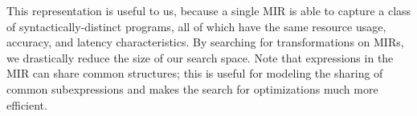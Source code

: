 
This representation is useful to us, because a single MIR is able to capture a
class of syntactically-distinct programs, all of which have the same resource
usage, accuracy, and latency characteristics.  By searching for transformations
on MIRs, we drastically reduce the size of our search space.  Note that
expressions in the MIR can share common structures; this is useful for modeling
the sharing of common subexpressions and makes the search for optimizations
much more efficient.


